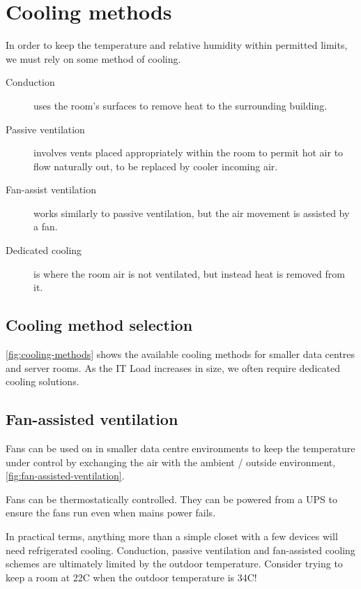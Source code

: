 \documentclass{pgnotes}
\begin{document}
\section{Cooling methods}

In order to keep the temperature and relative humidity within permitted limits, we must rely on some method of cooling.

\begin{description}
\item[Conduction] uses the room's surfaces to remove heat to the surrounding building.
\item[Passive ventilation] involves vents placed appropriately within the room to permit hot air to flow naturally out, to be replaced by cooler incoming air.
\item[Fan-assist ventilation] works similarly to passive ventilation, but the air movement is assisted by a fan.
\item[Dedicated cooling] is where the room air is not ventilated, but instead heat is removed from it. 
\end{description}

\subsection{Cooling method selection}

\autoref{fig:cooling-methods} shows the available cooling methods for smaller data centres and server rooms.
As the IT Load increases in size, we often require dedicated cooling solutions.


\subsection{Fan-assisted ventilation}

Fans can be used on in smaller data centre environments to keep the temperature under control by exchanging the air with the ambient / outside environment, \autoref{fig:fan-assisted-ventilation}.


Fans can be thermostatically controlled.
They can be powered from a UPS to ensure the fans run even when mains power fails. 

In practical terms, anything more than a simple closet with a few devices will need refrigerated cooling.
Conduction, passive ventilation and fan-assisted cooling schemes are ultimately limited by the outdoor temperature.
Consider trying to keep a room at 22C when the outdoor temperature is 34C!
\end{document}
